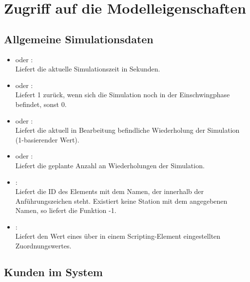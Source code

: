 \chapter{Zugriff auf die Modelleigenschaften}



\section{Allgemeine Simulationsdaten}

\begin{itemize}

\item
{} oder :\\
Liefert die aktuelle Simulationszeit in Sekunden.

\item
{} oder :\\
Liefert 1 zurück, wenn sich die Simulation noch in der Einschwingphase befindet, sonst 0.

\item
{} oder :\\
Liefert die aktuell in Bearbeitung befindliche Wiederholung der Simulation (1-basierender Wert).

\item
{} oder :\\
Liefert die geplante Anzahl an Wiederholungen der Simulation.

\item
{}:\\
Liefert die ID des Elements mit dem Namen, der innerhalb der Anführungszeichen steht.
Existiert keine Station mit dem angegebenen Namen, so liefert die Funktion -1.

\item
{}:\\
Liefert den Wert eines über  in einem Scripting-Element eingestellten Zuordnungswertes.

\end{itemize}





\section{Kunden im System}



